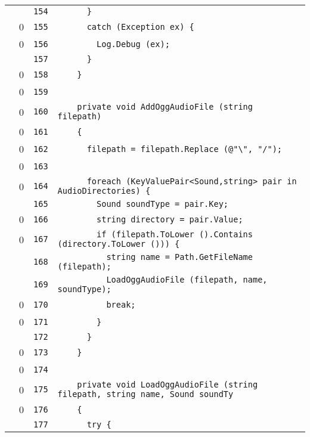 \documentclass[a4paper,10pt]{article}
\begin{document}
\begin{longtable}[l]{lrrl}
\cellcolor{gray} &  & \verb~154~ & \verb~      }~\\
\cellcolor{red} & 0 & \verb~155~ & \verb~      catch (Exception ex) {~\\
\cellcolor{red} & 0 & \verb~156~ & \verb~        Log.Debug (ex);~\\
\cellcolor{gray} &  & \verb~157~ & \verb~      }~\\
\cellcolor{red} & 0 & \verb~158~ & \verb~    }~\\
\cellcolor{red} & 0 & \verb~159~ & \verb~~\\
\cellcolor{red} & 0 & \verb~160~ & \verb~    private void AddOggAudioFile (string filepath)~\\
\cellcolor{red} & 0 & \verb~161~ & \verb~    {~\\
\cellcolor{red} & 0 & \verb~162~ & \verb~      filepath = filepath.Replace (@"\", "/");~\\
\cellcolor{red} & 0 & \verb~163~ & \verb~~\\
\cellcolor{red} & 0 & \verb~164~ & \verb~      foreach (KeyValuePair<Sound,string> pair in AudioDirectories) {~\\
\cellcolor{gray} &  & \verb~165~ & \verb~        Sound soundType = pair.Key;~\\
\cellcolor{red} & 0 & \verb~166~ & \verb~        string directory = pair.Value;~\\
\cellcolor{red} & 0 & \verb~167~ & \verb~        if (filepath.ToLower ().Contains (directory.ToLower ())) {~\\
\cellcolor{gray} &  & \verb~168~ & \verb~          string name = Path.GetFileName (filepath);~\\
\cellcolor{gray} &  & \verb~169~ & \verb~          LoadOggAudioFile (filepath, name, soundType);~\\
\cellcolor{red} & 0 & \verb~170~ & \verb~          break;~\\
\cellcolor{red} & 0 & \verb~171~ & \verb~        }~\\
\cellcolor{gray} &  & \verb~172~ & \verb~      }~\\
\cellcolor{red} & 0 & \verb~173~ & \verb~    }~\\
\cellcolor{red} & 0 & \verb~174~ & \verb~~\\
\cellcolor{red} & 0 & \verb~175~ & \verb~    private void LoadOggAudioFile (string filepath, string name, Sound soundTy~\\
\cellcolor{red} & 0 & \verb~176~ & \verb~    {~\\
\cellcolor{gray} &  & \verb~177~ & \verb~      try {~\\

\end{longtable}
\end{document}
